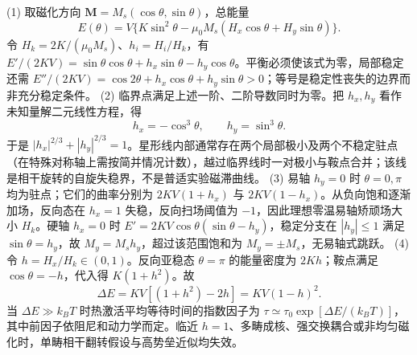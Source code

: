 (1) 取磁化方向 \(\boldsymbol M=M_s(\cos\theta,\sin\theta)\)，总能量
\[
E(\theta)=V\{K\sin^2\theta-\mu_0M_s(H_x\cos\theta+H_y\sin\theta)\}.
\]
令 \(H_k=2K/(\mu_0M_s)\)、\(h_i=H_i/H_k\)，有 \(E'/(2KV)=\sin\theta\cos\theta+h_x\sin\theta-h_y\cos\theta\)。平衡必须使该式为零，局部稳定还需 \(E''/(2KV)=\cos2\theta+h_x\cos\theta+h_y\sin\theta>0\)；等号是稳定性丧失的边界而非充分稳定条件。
(2) 临界点满足上述一阶、二阶导数同时为零。把 \(h_x,h_y\) 看作未知量解二元线性方程，得
\[
h_x=-\cos^3\theta,\qquad h_y=\sin^3\theta.
\]
于是 \(|h_x|^{2/3}+|h_y|^{2/3}=1\)。星形线内部通常存在两个局部极小及两个不稳定驻点（在特殊对称轴上需按简并情况计数），越过临界线时一对极小与鞍点合并；该线是相干旋转的自旋失稳界，不是普适实验磁滞曲线。
(3) 易轴 \(h_y=0\) 时 \(\theta=0,\pi\) 均为驻点；它们的曲率分别为 \(2KV(1+h_x)\) 与 \(2KV(1-h_x)\)。从负向饱和逐渐加场，反向态在 \(h_x=1\) 失稳，反向扫场阈值为 \(-1\)，因此理想零温易轴矫顽场大小 \(H_k\)。硬轴 \(h_x=0\) 时 \(E'=2KV\cos\theta(\sin\theta-h_y)\)，稳定分支在 \(|h_y|\le1\) 满足 \(\sin\theta=h_y\)，故 \(M_y=M_sh_y\)，超过该范围饱和为 \(M_y=\pm M_s\)，无易轴式跳跃。
(4) 令 \(h=H_x/H_k\in(0,1)\)。反向亚稳态 \(\theta=\pi\) 的能量密度为 \(2Kh\)；鞍点满足 \(\cos\theta=-h\)，代入得 \(K(1+h^2)\)。故
\[
\Delta E=KV[(1+h^2)-2h]=KV(1-h)^2.
\]
当 \(\Delta E\gg k_BT\) 时热激活平均等待时间的指数因子为 \(\tau\simeq\tau_0\exp[\Delta E/(k_BT)]\)，其中前因子依阻尼和动力学而定。临近 \(h=1\)、多畴成核、强交换耦合或非均匀磁化时，单畴相干翻转假设与高势垒近似均失效。
